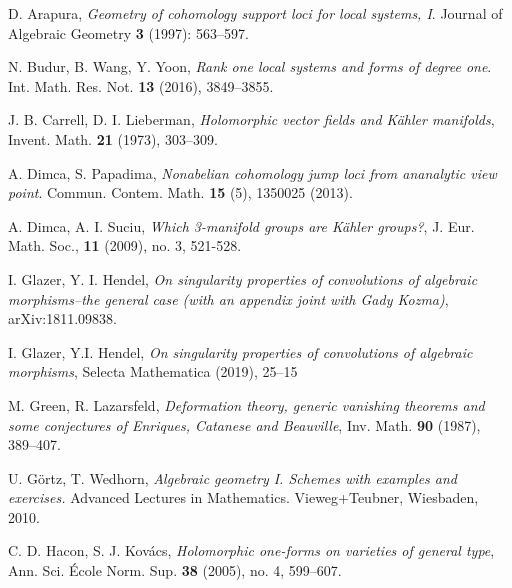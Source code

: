 \documentclass[a4paper,12pt,reqno]{amsart}
\theoremstyle{plain}
\theoremstyle{remark}
\begin{document}
\begin{thebibliography}{HKLR} 





 D. Arapura, \textit{Geometry of cohomology support loci for local systems, I}. Journal of Algebraic Geometry \textbf{3} (1997): 563--597.


 N. Budur, B. Wang, Y. Yoon, \textit{Rank one local systems and forms of degree one}. Int. Math. Res. Not. \textbf{13} (2016), 3849--3855.



 J. B. Carrell, D. I. Lieberman,  \textit{Holomorphic vector fields and K\"ahler manifolds}, Invent. Math. \textbf{21} (1973), 303--309.

A. Dimca, S. Papadima, \textit{Nonabelian cohomology jump loci from ananalytic view point}. Commun. Contem. Math. \textbf{15} (5), 1350025 (2013).


 A. Dimca, A. I. Suciu, \textit{Which 3-manifold groups are K\"ahler groups?}, J. Eur. Math. Soc., \textbf{11} (2009), no. 3, 521-528.

 I. Glazer, Y. I. Hendel, \textit{On singularity properties of convolutions of algebraic morphisms--the general case (with an appendix joint with Gady Kozma)}, arXiv:1811.09838.

  I. Glazer, Y.I. Hendel, \textit{On singularity properties of convolutions of algebraic morphisms}, Selecta Mathematica (2019), 25--15


 M. Green, R. Lazarsfeld, \textit{Deformation theory, generic vanishing theorems and some conjectures of Enriques, Catanese and Beauville}, Inv. Math. \textbf{90} (1987), 389--407.

 U. G\"ortz, T. Wedhorn, \textit{Algebraic geometry I. Schemes with examples and exercises.} Advanced Lectures in Mathematics. Vieweg+Teubner, Wiesbaden, 2010. 

 C. D. Hacon, S. J. Kov\'acs, \textit{Holomorphic one-forms on varieties of general type}, Ann. Sci. \'Ecole Norm. Sup. \textbf{38} (2005), no. 4, 599--607.


\end{thebibliography}
\end{document}
